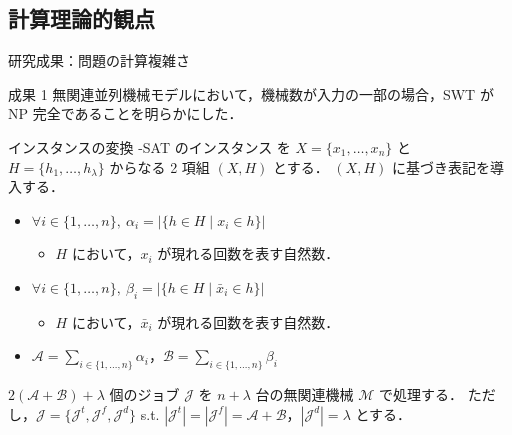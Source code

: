 \documentclass[dvipdfmx]{beamer}
\begin{document}
    \subsection{計算理論的観点}
    \begin{frame}{研究成果：問題の計算複雑さ}
      \begin{alertblock}{成果 1}
        無関連並列機械モデルにおいて，機械数が入力の一部の場合，SWT が NP 完全であることを明らかにした．
      \end{alertblock}
      \begin{block}{インスタンスの変換}
        {-SAT} のインスタンス を $X = \{x_1,\ldots,x_n\}$ と $H = \{h_1,\ldots,h_{\lambda}\}$ からなる 2 項組 $(X,H)$ とする．
        $(X,H)$ に基づき表記を導入する．
        \begin{itemize}
          \item $\forall i \in \{1,\ldots,n\},~\alpha_i = |\{h \in H \mid x_i \in h\}|$
          \begin{itemize}
            \item $H$ において，$x_i$ が現れる回数を表す自然数．
          \end{itemize}
          \item $\forall i \in \{1,\ldots,n\},~\beta_i = |\{h \in H \mid \bar x_i \in h\}|$
          \begin{itemize}
            \item $H$ において，$\bar x_i$ が現れる回数を表す自然数．
          \end{itemize}
          \item $\mathcal{A} = {\displaystyle \sum_{i \in \{1,\ldots,n\}}\alpha_i}$，$\mathcal{B} = {\displaystyle \sum_{i \in \{1,\ldots,n\}}\beta_i}$
        \end{itemize}
      \end{block}
      $2(\mathcal{A} + \mathcal{B}) + \lambda$ 個のジョブ $\mathcal{J}$ を $n + \lambda$ 台の無関連機械 $\mathcal{M}$ で処理する．
      ただし，$\mathcal{J} = \{\mathcal{J}^t,\mathcal{J}^f,\mathcal{J}^d\}$ s.t. $|\mathcal{J}^t| = |\mathcal{J}^f| = \mathcal{A} + \mathcal{B}$，$|\mathcal{J}^d| = \lambda$ とする．
    \end{frame}
\end{document}
